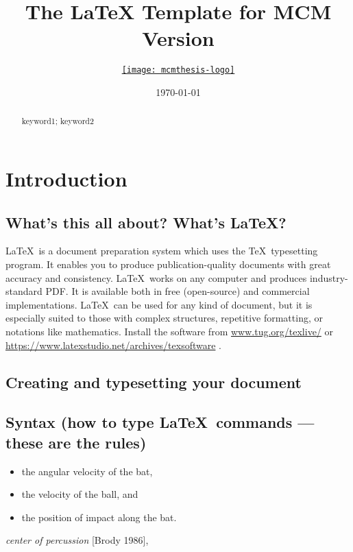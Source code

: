 \documentclass{mcmthesis}
\title{The \LaTeX{} Template for MCM Version \MCMversion}
\author{\small \href{http://www.latexstudio.net/}
  {\texttt{[image: mcmthesis-logo]}}}
\date{\today}
\begin{document}
\begin{abstract}
  \lipsum[1]
  \begin{keywords}
    keyword1; keyword2
  \end{keywords}
\end{abstract}
\maketitle
\section{Introduction}
\subsection{What's this all about? What's \LaTeX?}
\LaTeX\ is a document preparation system which uses the \TeX\
typesetting program. It enables you to produce
publication-quality documents with great accuracy and
consistency. \LaTeX\ works on any computer and produces
industry-standard PDF. It is available both in free (open-source)
and commercial implementations. \LaTeX\ can be used for any kind
of document, but it is especially suited to those with complex
structures, repetitive formatting, or notations like
mathematics. Install the software from
\url{www.tug.org/texlive/} or \url{https://www.latexstudio.net/archives/texsoftware}
.
\subsection{Creating and typesetting your document}

\subsection{Syntax (how to type \LaTeX\ commands --- these
  are the rules)}

\lipsum[3]
\begin{itemize}
  \item the angular velocity of the bat,
  \item the velocity of the ball, and
  \item the position of impact along the bat.
\end{itemize}
\lipsum[4]
\emph{center of percussion} [Brody 1986], \lipsum[5]
\end{document}
